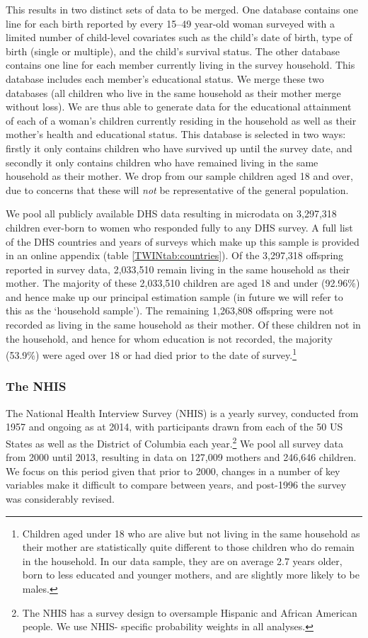 \documentclass[subeqn]{article}
\begin{document}
\begin{spacing}{1.4}
This results in two distinct sets of data to be merged. One database contains 
one line for each birth reported by every 15--49 year-old woman surveyed with a 
limited number of child-level covariates such as the child's date of birth, type 
of birth (single or multiple), and the child's survival status. The other 
database contains one line for each member currently living in the survey
household. This database includes each member's educational status. We merge
these two databases (all children who live in the same household as their mother
merge without loss).  We are thus able to generate data for the educational 
attainment of each of a woman's children currently residing in the household as 
well as their mother's health and educational status. This database is selected in 
two ways: firstly it only contains children who have survived up until the survey 
date, and secondly it only contains children who have remained living in the same 
household as their mother. We drop from our sample children aged 18 and over, due
to concerns that these will \emph{not} be representative of the general 
population.

We pool all publicly available DHS data resulting in microdata on 3,297,318 
children ever-born to women who responded fully to any DHS survey. A full list of 
the DHS countries and years of surveys which make up this sample is provided in
an online appendix (table \ref{TWINtab:countries}).  Of the 3,297,318 offspring 
reported in survey data, 2,033,510 remain living in the same household as their 
mother.  The majority of these 2,033,510 children are aged 18 and under (92.96\%) 
and hence make up our principal estimation sample (in future we will refer to this 
as the `household sample'). The remaining 1,263,808 offspring were not recorded as 
living in the same household as their mother.  Of these children not in the 
household, and hence for whom education is not recorded, the majority (53.9\%) 
were aged over 18 or had died prior to the date of survey.\footnote{Children aged 
under 18 who are alive but not living in the same household as their mother are 
statistically quite different to those children who do remain in the household. 
In our data sample, they are on average 2.7 years older, born to less educated 
and younger mothers, and are slightly more likely to be males.}

\subsubsection{The NHIS}
The National Health Interview Survey (NHIS) is a yearly survey, conducted from 
1957 and ongoing as at 2014, with participants drawn from each of the 50 US 
States as well as the District of Columbia each year.\footnote{The NHIS has a
survey design to oversample Hispanic and African American people.  We use NHIS-%
specific probability weights in all analyses.}  We pool all survey data from 
2000 until 2013, resulting in data on 127,009 mothers and 246,646 children. We 
focus on this period given that prior to 2000, changes in a number of key 
variables make it difficult to compare between years, and post-1996 the survey 
was considerably revised.


\end{spacing}
\end{document}
